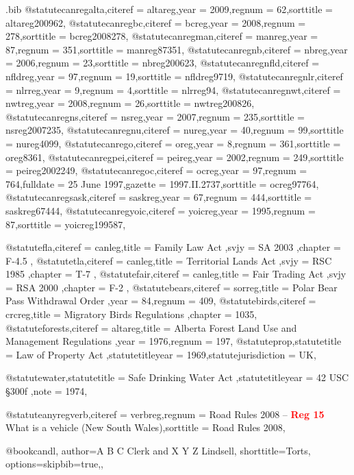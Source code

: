 \begin{filecontents*}[overwrite]{\jobname.bib}
@statute{canregalta,citeref = {altareg},year = {2009},regnum = {62},sorttitle = {altareg200962},}
@statute{canregbc,citeref = {bcreg},year = {2008},regnum = {278},sorttitle = {bcreg2008278},}
@statute{canregman,citeref = {manreg},year = {87},regnum = {351},sorttitle = {manreg87351},}
@statute{canregnb,citeref = {nbreg},year = {2006},regnum = {23},sorttitle = {nbreg200623},}
@statute{canregnfld,citeref = {nfldreg},year = {97},regnum = {19},sorttitle = {nfldreg9719},}
@statute{canregnlr,citeref = {nlrreg},year = {9},regnum = {4},sorttitle = {nlrreg94},}
@statute{canregnwt,citeref = {nwtreg},year = {2008},regnum = {26},sorttitle = {nwtreg200826},}
@statute{canregns,citeref = {nsreg},year = {2007},regnum = {235},sorttitle = {nsreg2007235},}
@statute{canregnu,citeref = {nureg},year = {40},regnum = {99},sorttitle = {nureg4099},}
@statute{canrego,citeref = {oreg},year = {8},regnum = {361},sorttitle = {oreg8361},}
@statute{canregpei,citeref = {peireg},year = {2002},regnum = {249},sorttitle = {peireg2002249},}
@statute{canregoc,citeref = {ocreg},year = {97},regnum = {764},fulldate = {25 June 1997},gazette = { 1997.II.2737},sorttitle = {ocreg97764},}
@statute{canregsask,citeref = {saskreg},year = {67},regnum = {444},sorttitle = {saskreg67444},}
@statute{canregyoic,citeref = {yoicreg},year = {1995},regnum = {87},sorttitle = {yoicreg199587},}


@statute{fla,citeref = {canleg},title = {Family Law Act },svjy = {SA 2003 },chapter = {F-4.5 },}
@statute{tla,citeref = {canleg},title = {Territorial Lands Act },svjy = {RSC 1985 },chapter = {T-7 },}
@statute{fair,citeref = {canleg},title = {Fair Trading Act },svjy = {RSA 2000 },chapter = {F-2 },}
@statute{bears,citeref = {sorreg},title = {Polar Bear Pass Withdrawal Order },year = {84},regnum = {409},}
@statute{birds,citeref = {crcreg},title = {Migratory Birds Regulations },chapter = {1035},}
@statute{forests,citeref = {altareg},title = {Alberta Forest Land Use and Management Regulations },year = {1976},regnum = {197},}
@statute{prop,statutetitle = {Law of Property Act },statutetitleyear = {1969},statutejurisdiction = {UK},}

@statute{water,statutetitle = {Safe Drinking Water Act },statutetitleyear = {42 USC §300f },note = {1974},}

@statute{anyregverb,citeref = {verbreg},regnum = {Road Rules 2008 -- \textcolor{red}{\textbf{Reg 15}} What is a vehicle (New South Wales)},sorttitle = {Road Rules 2008},}

@book{candl,
author={A B C Clerk and X Y Z Lindsell},
shorttitle={Torts},
options={skipbib=true,},
}

\end{filecontents*}




